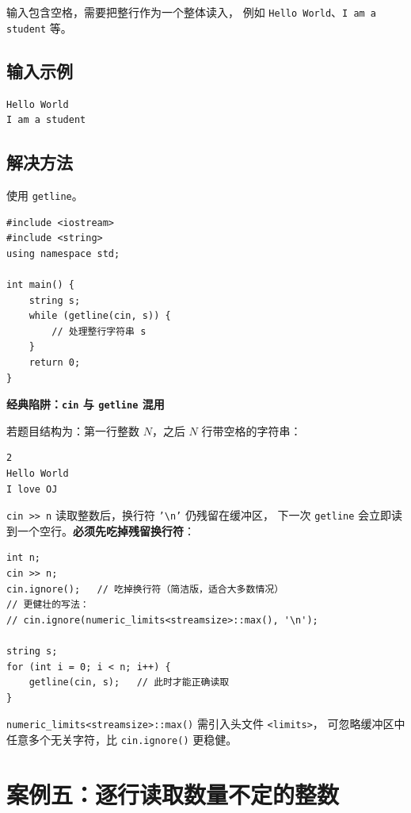 \documentclass[12pt, a4paper]{article}
\begin{document}
输入包含空格，需要把整行作为一个整体读入，
例如 \texttt{Hello World}、\texttt{I am a student} 等。

\subsection{输入示例}

\begin{lstlisting}[style=input]
Hello World
I am a student
\end{lstlisting}

\subsection{解决方法}

使用 \texttt{getline}。

\begin{lstlisting}[style=cpp]
#include <iostream>
#include <string>
using namespace std;

int main() {
    string s;
    while (getline(cin, s)) {
        // 处理整行字符串 s
    }
    return 0;
}
\end{lstlisting}

\begin{warningbox}
\textbf{经典陷阱：\texttt{cin} 与 \texttt{getline} 混用}

若题目结构为：第一行整数 $N$，之后 $N$ 行带空格的字符串：

\begin{lstlisting}[style=input]
2
Hello World
I love OJ
\end{lstlisting}

\texttt{cin >> n} 读取整数后，换行符 \texttt{'\textbackslash n'} 仍残留在缓冲区，
下一次 \texttt{getline} 会立即读到一个空行。\textbf{必须先吃掉残留换行符}：

\begin{lstlisting}[style=cpp]
int n;
cin >> n;
cin.ignore();   // 吃掉换行符（简洁版，适合大多数情况）
// 更健壮的写法：
// cin.ignore(numeric_limits<streamsize>::max(), '\n');

string s;
for (int i = 0; i < n; i++) {
    getline(cin, s);   // 此时才能正确读取
}
\end{lstlisting}

\texttt{numeric\_limits<streamsize>::max()} 需引入头文件 \texttt{<limits>}，
可忽略缓冲区中任意多个无关字符，比 \texttt{cin.ignore()} 更稳健。
\end{warningbox}

\section{案例五：逐行读取数量不定的整数}
\end{document}
